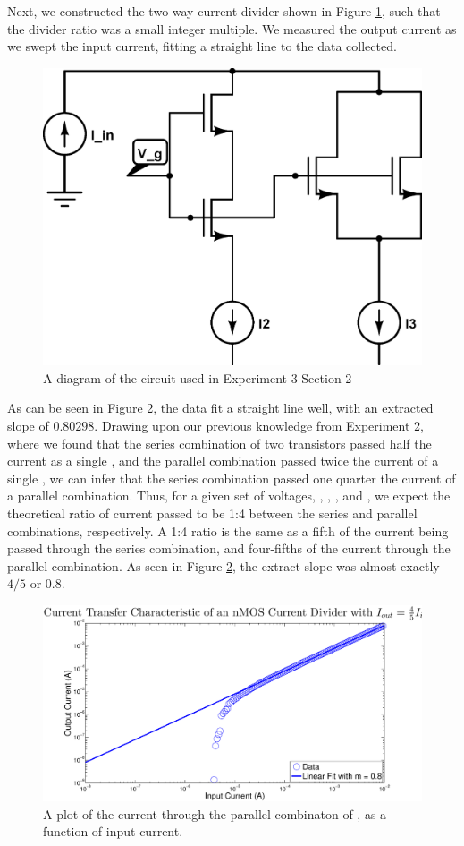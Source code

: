 Next, we constructed the two-way current divider shown in Figure \ref{fig:exp3circuit2}, such that the divider ratio was
a small integer multiple. We measured the output current as we swept the input current, fitting a straight line to the data collected.


\begin{figure}[H]
\centering
\includegraphics[width=0.55\linewidth]{../Figures/Experiment3CircuitDiagram2.eps}
\caption{A diagram of the circuit used in Experiment 3 Section 2}
\label{fig:exp3circuit2}
\end{figure}


As can be seen in Figure \ref{fig:exp3fit2}, the data fit a straight line well, with an extracted slope of $0.80298$. Drawing upon our previous knowledge from Experiment 2, where we found that the series combination of two \nMOS transistors passed half the current as a single \nMOS, and the parallel combination passed twice the current of a single \nMOS, we can infer that the series combination passed one quarter the current of a parallel combination. 
Thus, for a given set of voltages, \Vg, \Vd, \Vb, \Vd and \Vs, we expect the theoretical ratio of current passed to be 1:4 between the series and parallel combinations, respectively. A 1:4 ratio is the same as a fifth of the current being passed through the series combination, and four-fifths of the current through the parallel combination. As seen in Figure \ref{fig:exp3fit2}, the extract slope was almost exactly $4/5$ or $0.8$.

\begin{figure}[H]
\centering
\includegraphics[width=\linewidth]{../Figures/Experiment3Figure2.eps}
\caption{A plot of the current through the parallel combinaton of \nMOS, as a function of input current.}
\label{fig:exp3fit2}
\end{figure}

